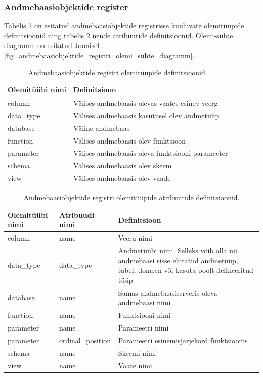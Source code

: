 \documentclass[a4paper,12pt]{article} %
\begin{document}
\subsubsection{Andmebaasiobjektide register}
Tabelis \ref{table_er_andmebaasiobjektide_registri_olemitüüpide_definitsioonid} on esitatud andmebaasiobjektide registrisse kuuluvate olemitüüpide definitsioonid ning tabelis \ref{table_er_andmebaasiobjektide_registri_olemitüüpide_atribuutide_definitsioonid} nende atribuutide definitsioonid. Olemi-suhte diagramm on esitatud Joonisel \ref{fig_andmebaasiobjektide_registri_olemi_suhte_diagramm}.

\begin{table}[H]
\centering
\caption{Andmebaasiobjektide registri olemitüüpide definitsioonid.}
\label{table_er_andmebaasiobjektide_registri_olemitüüpide_definitsioonid}
\begin{tabular}{|p{4cm}|p{11cm}|}
\hline
\rowcolor{rowgray}
Olemitüübi nimi & Definitsioon \\ \hline
column & Välises andmebaasis olevas vaates esinev veerg\\ \hline
data\_type & Välises andmebaasis kasutusel olev andmetüüp\\ \hline
database & Väline andmebaas \\ \hline
function & Välises andmebaasis olev funktsioon\\ \hline
parameter & Välises andmebaasis oleva funktsiooni parameeter\\ \hline
schema & Välises andmebaasis olev skeem\\ \hline
view & Välises andmebaasis olev vaade\\ \hline
\end{tabular}
\end{table}

\begin{table}[H]
\centering
\caption{Andmebaasiobjektide registri olemitüüpide atribuutide definitsioonid.}
\label{table_er_andmebaasiobjektide_registri_olemitüüpide_atribuutide_definitsioonid}
\begin{tabular}{|p{4cm}|p{4cm}|p{7cm}|}
\hline
\rowcolor{rowgray}
Olemitüübi nimi & Atribuudi nimi & Definitsioon \\ \hline
column & name & Veeru nimi \\ \hline
data\_type & data\_type & Andmetüübi nimi. Selleks võib olla nii andmebaasi sisse ehitatud andmetüüp, tabel, domeen või kasuta poolt defineeritud tüüp \\ \hline
database & name & Samas andmebaasiserveris oleva andmebaasi nimi \\ \hline
function & name & Funktsiooni nimi \\ \hline
parameter & name & Parameetri nimi \\ \hline
parameter & ordinal\_position & Parameetri esinemisjärjekord funktsioonis \\ \hline
schema & name & Skeemi nimi \\ \hline
view & name & Vaate nimi \\ \hline
\end{tabular}
\end{table}
\end{document}
